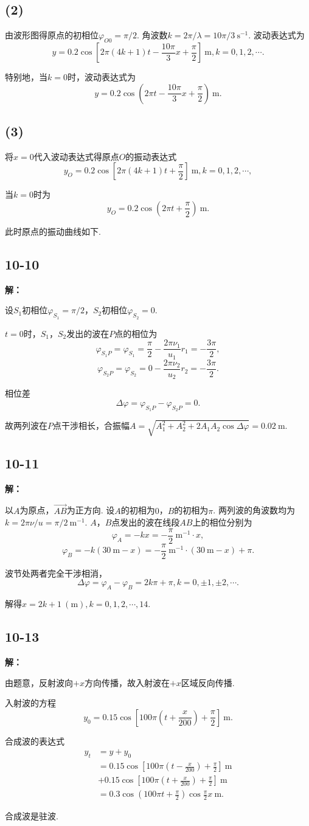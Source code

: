 \documentclass[twocolumn]{ctexart}
\newcommand{\sol}[1]{\subsection*{#1}\noindent\textbf{解：}
	
}
\newcommand{\un}[1]{\ \mathrm{#1}}
\begin{document}
\subsection*{(2)}
由波形图得原点的初相位$\varphi_{O0}=\pi/2$. 角波数$k=2\pi/\lambda=10\pi/3\un{s^{-1}}$. 波动表达式为
$$y=0.2\cos\left[2\pi(4k+1)t-\frac{10\pi}{3}x+\frac{\pi}{2}\right]\un m,k=0,1,2,\cdots.$$

特别地，当$k=0$时，波动表达式为
$$y=0.2\cos\left(2\pi t-\frac{10\pi}{3}x+\frac{\pi}{2}\right)\un m.$$

\subsection*{(3)}
将$x=0$代入波动表达式得原点$O$的振动表达式
$$y_O=0.2\cos\left[2\pi(4k+1)t+\frac{\pi}{2}\right]\un m,k=0,1,2,\cdots,$$

当$k=0$时为
$$y_O=0.2\cos\left(2\pi t+\frac{\pi}{2}\right)\un m.$$

此时原点的振动曲线如下.

\sol{10-10}
设$S_1$初相位$\varphi_{S_1}=\pi/2$，$S_2$初相位$\varphi_{S_2}=0$.

$t=0$时，$S_1$，$S_2$发出的波在$P$点的相位为
$$\varphi_{S_1P}=\varphi_{S_1}=\frac{\pi}{2}-\frac{2\pi\nu_1}{u_1}r_1=-\frac{3\pi}{2},$$
$$\varphi_{S_2P}=\varphi_{S_2}=0-\frac{2\pi\nu_2}{u_2}r_2=-\frac{3\pi}{2}.$$

相位差
$$\Delta\varphi=\varphi_{S_1P}-\varphi_{S_2P}=0.$$

故两列波在$P$点干涉相长，合振幅$A=\sqrt{A_1^2+A_2^2+2A_1A_2\cos\Delta\varphi}=0.02\un m$.

\sol{10-11}
以$A$为原点，$\overrightarrow{AB}$为正方向. 设$A$的初相为$0$，$B$的初相为$\pi$. 两列波的角波数均为$k=2\pi\nu/u=\pi/2\un{m^{-1}}$. $A$，$B$点发出的波在线段$AB$上的相位分别为
$$\varphi_A=-kx=-\frac{\pi}{2}\un{m^{-1}}\cdot x,$$
$$\varphi_B=-k(30\un m-x)=-\frac{\pi}{2}\un{m^{-1}}\cdot(30\un m-x)+\pi.$$

波节处两者完全干涉相消，
$$\Delta\varphi=\varphi_A-\varphi_B=2k\pi+\pi,k=0,\pm1,\pm2,\cdots.$$

解得$x=2k+1\un{(m)},k=0,1,2,\cdots,14$.

\sol{10-13}
由题意，反射波向$+x$方向传播，故入射波在$+x$区域反向传播.

入射波的方程
$$y_0=0.15\cos\left[100\pi\left(t+\frac{x}{200}\right)+\frac{\pi}{2}\right]\un m.$$

合成波的表达式
\begin{align*}
	y_t&=y+y_0\\
	&=0.15\cos\left[100\pi\left(t-\frac{x}{200}\right)+\frac{\pi}{2}\right]\un m\\
	&+0.15\cos\left[100\pi\left(t+\frac{x}{200}\right)+\frac{\pi}{2}\right]\un m\\
	&=0.3\cos\left(100\pi t+\frac{\pi}{2}\right)\cos\frac{\pi}{2}x\un m.
\end{align*}

合成波是驻波.
\end{document}
